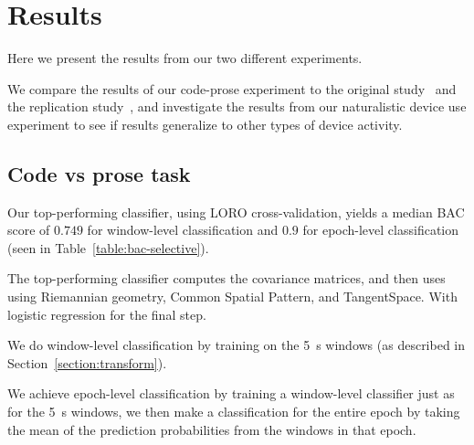 \chapter{Results}\label{section:results}

    Here we present the results from our two different experiments.

    We compare the results of our code-prose experiment to the original study~\cite{floyd_decoding_2017} and the replication study~\cite{fucci_replication_2019}, and investigate the results from our naturalistic device use experiment to see if results generalize to other types of device activity.


    \section{Code vs prose task}

        Our top-performing classifier, using LORO cross-validation, yields a median BAC score of $0.749$  for window-level classification and $0.9$ for epoch-level classification (seen in Table~\ref{table:bac-selective}).

        The top-performing classifier computes the covariance matrices, and then uses using Riemannian geometry, Common Spatial Pattern, and TangentSpace. With logistic regression for the final step.

        We do window-level classification by training on the \SI{5}{\second} windows (as described in Section~\ref{section:transform}).

        We achieve epoch-level classification by training a window-level classifier just as for the \SI{5}{\second} windows, we then make a classification for the entire epoch by taking the mean of the prediction probabilities from the windows in that epoch.

        
